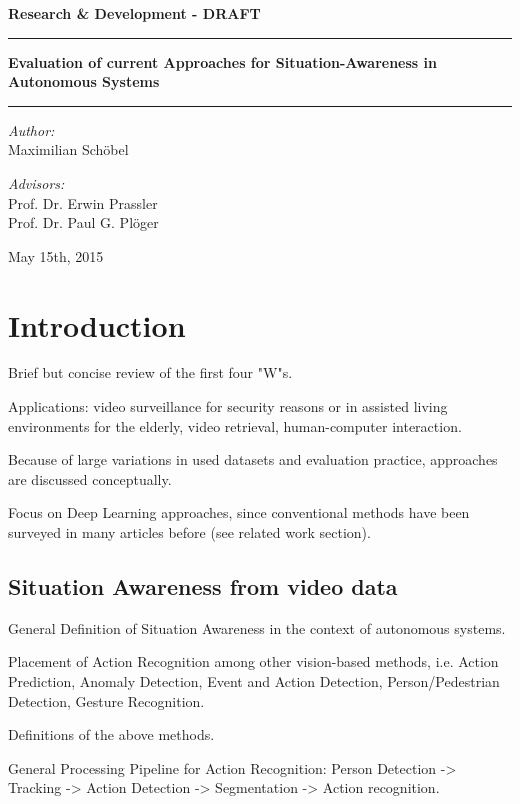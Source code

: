\documentclass{scrartcl}
\begin{document}
\begin{center}
\LARGE
\textbf{Research \& Development - DRAFT}

\vspace{2cm}

\rule{\linewidth}{2pt}
\textbf{Evaluation of current Approaches for Situation-Awareness in Autonomous Systems} \\
\rule{\linewidth}{2pt}
\bigskip

\normalsize
\textit{Author:}\\
Maximilian Schöbel
\bigskip

\textit{Advisors:}\\
Prof. Dr. Erwin Prassler\\
Prof. Dr. Paul G. Plöger

\vspace{4cm}
May 15th, 2015
\end{center}

\newpage

\tableofcontents

\newpage

\section{Introduction}
Brief but concise review of the first four "W"s.

Applications: video surveillance for security reasons or in assisted living environments for the elderly, video retrieval, human-computer interaction.

Because of large variations in used datasets and evaluation practice, approaches are discussed conceptually.

Focus on Deep Learning approaches, since conventional methods have been surveyed in many articles before (see related work section).


\subsection{Situation Awareness from video data}
General Definition of Situation Awareness in the context of autonomous systems.

Placement of Action Recognition among other vision-based methods, i.e. Action Prediction, Anomaly Detection, Event and Action Detection, Person/Pedestrian Detection, Gesture Recognition.

Definitions of the above methods.

General Processing Pipeline for Action Recognition: Person Detection -> Tracking -> Action Detection -> Segmentation -> Action recognition.
\end{document}
